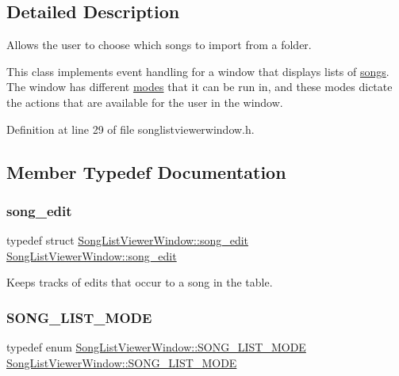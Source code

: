 \subsection{Detailed Description}
Allows the user to choose which songs to import from a folder.

This class implements event handling for a window that displays lists of \mbox{\hyperlink{class_song}{songs}}. The window has different \mbox{\hyperlink{class_song_list_viewer_window_a6f23a68c416173f6b571a2cc4990a927}{modes}} that it can be run in, and these modes dictate the actions that are available for the user in the window. 

Definition at line 29 of file songlistviewerwindow.\+h.



\subsection{Member Typedef Documentation}
\mbox{\label{class_song_list_viewer_window_a9d231624b8aaaceace0c6c3e1e389893}} 
\subsubsection{\texorpdfstring{song\+\_\+edit}{song\_edit}}
{\footnotesize\ttfamily typedef struct \mbox{\hyperlink{struct_song_list_viewer_window_1_1song__edit}{Song\+List\+Viewer\+Window\+::song\+\_\+edit}}  \mbox{\hyperlink{struct_song_list_viewer_window_1_1song__edit}{Song\+List\+Viewer\+Window\+::song\+\_\+edit}}\hspace{0.3cm}{\ttfamily [private]}}



Keeps tracks of edits that occur to a song in the table. 

\mbox{\label{class_song_list_viewer_window_a2942818cc26b8ff9e29827f97356ac9c}} 
\subsubsection{\texorpdfstring{S\+O\+N\+G\+\_\+\+L\+I\+S\+T\+\_\+\+M\+O\+DE}{SONG\_LIST\_MODE}}
{\footnotesize\ttfamily typedef enum \mbox{\hyperlink{class_song_list_viewer_window_a6f23a68c416173f6b571a2cc4990a927}{Song\+List\+Viewer\+Window\+::\+S\+O\+N\+G\+\_\+\+L\+I\+S\+T\+\_\+\+M\+O\+DE}}  \mbox{\hyperlink{class_song_list_viewer_window_a6f23a68c416173f6b571a2cc4990a927}{Song\+List\+Viewer\+Window\+::\+S\+O\+N\+G\+\_\+\+L\+I\+S\+T\+\_\+\+M\+O\+DE}}}




